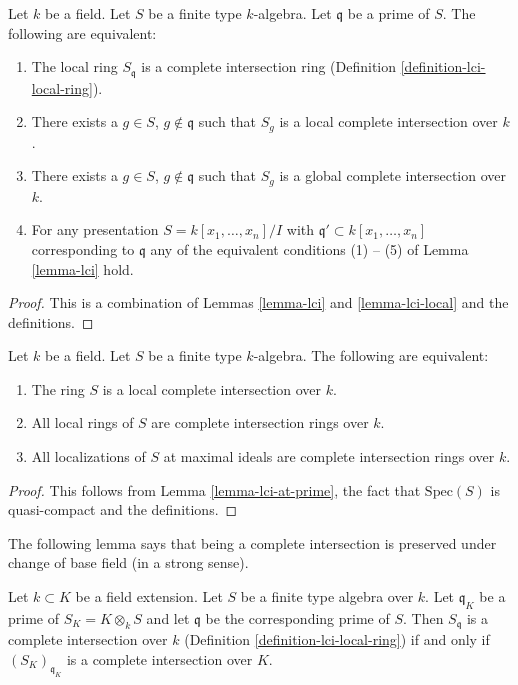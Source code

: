 \begin{lemma}
\label{lemma-lci-at-prime}
Let $k$ be a field. Let $S$ be a finite type $k$-algebra.
Let $\mathfrak q$ be a prime of $S$. The following are
equivalent:
\begin{enumerate}
\item The local ring $S_{\mathfrak q}$ is a complete intersection
ring (Definition \ref{definition-lci-local-ring}).
\item There exists a $g \in S$, $g \not \in \mathfrak q$
such that $S_g$ is a local complete intersection over $k$.
\item There exists a $g \in S$, $g \not \in \mathfrak q$
such that $S_g$ is a global complete intersection over $k$.
\item For any presentation $S = k[x_1, \ldots, x_n]/I$ with
$\mathfrak q' \subset k[x_1, \ldots, x_n]$ corresponding to $\mathfrak q$
any of the equivalent conditions (1) -- (5) of Lemma \ref{lemma-lci} hold.
\end{enumerate}
\end{lemma}

\begin{proof}
This is a combination of Lemmas \ref{lemma-lci} and \ref{lemma-lci-local}
and the definitions.
\end{proof}

\begin{lemma}
\label{lemma-lci-global}
Let $k$ be a field. Let $S$ be a finite type $k$-algebra.
The following are equivalent:
\begin{enumerate}
\item The ring $S$ is a local complete intersection over $k$.
\item All local rings of $S$ are complete intersection rings over $k$.
\item All localizations of $S$
at maximal ideals are complete intersection rings over $k$.
\end{enumerate}
\end{lemma}

\begin{proof}
This follows from Lemma \ref{lemma-lci-at-prime},
the fact that $\text{Spec}(S)$ is quasi-compact and the definitions.
\end{proof}

\noindent
The following lemma says that being a complete intersection is
preserved under change of base field (in a strong sense).

\begin{lemma}
\label{lemma-lci-field-change-local}
Let $k \subset K$ be a field extension.
Let $S$ be a finite type algebra over $k$.
Let $\mathfrak q_K$ be a prime of $S_K = K \otimes_k S$
and let $\mathfrak q$ be the corresponding prime of $S$.
Then $S_{\mathfrak q}$ is a complete intersection
over $k$ (Definition \ref{definition-lci-local-ring})
if and only if $(S_K)_{\mathfrak q_K}$ is a complete
intersection over $K$.
\end{lemma}

